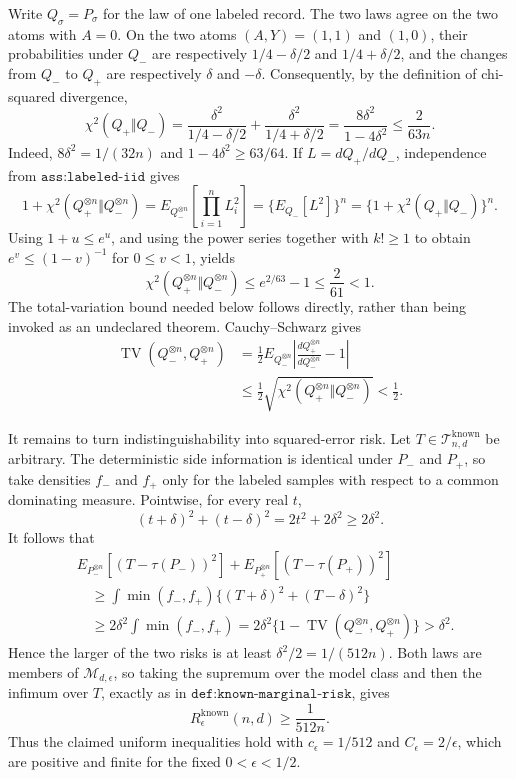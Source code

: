 Write \(Q_\sigma=P_\sigma\) for the law of one labeled record.  The two laws agree on the two atoms with \(A=0\).  On the two atoms \((A,Y)=(1,1)\) and \((1,0)\), their probabilities under \(Q_-\) are respectively \(1/4-\delta/2\) and \(1/4+\delta/2\), and the changes from \(Q_-\) to \(Q_+\) are respectively \(\delta\) and \(-\delta\).  Consequently, by the definition of chi-squared divergence,
\[
\chi^2(Q_+\Vert Q_-)
=\frac{\delta^2}{1/4-\delta/2}
 +\frac{\delta^2}{1/4+\delta/2}
=\frac{8\delta^2}{1-4\delta^2}
\leq\frac{2}{63n}.
\]
Indeed, \(8\delta^2=1/(32n)\) and \(1-4\delta^2\geq63/64\).  If \(L=dQ_+/dQ_-\), independence from \(\texttt{ass:labeled-iid}\) gives
\[
1+\chi^2(Q_+^{\otimes n}\Vert Q_-^{\otimes n})
=E_{Q_-^{\otimes n}}\!\left[\prod_{i=1}^{n}L_i^2\right]
=\{E_{Q_-}[L^2]\}^{n}
=\{1+\chi^2(Q_+\Vert Q_-)\}^{n}.
\]
Using \(1+u\leq e^u\), and using the power series together with \(k!\geq1\) to obtain \(e^v\leq(1-v)^{-1}\) for \(0\leq v<1\), yields
\[
\chi^2(Q_+^{\otimes n}\Vert Q_-^{\otimes n})
\leq e^{2/63}-1
\leq\frac{2}{61}<1.
\]
The total-variation bound needed below follows directly, rather than being invoked as an undeclared theorem.  Cauchy--Schwarz gives
\[
\begin{aligned}
\operatorname{TV}(Q_-^{\otimes n},Q_+^{\otimes n})
&=\frac12E_{Q_-^{\otimes n}}\left|
\frac{dQ_+^{\otimes n}}{dQ_-^{\otimes n}}-1
\right|\\
&\leq\frac12
\sqrt{\chi^2(Q_+^{\otimes n}\Vert Q_-^{\otimes n})}
<\frac12.
\end{aligned}
\]

It remains to turn indistinguishability into squared-error risk.  Let \(T\in\mathcal T^{\mathrm{known}}_{n,d}\) be arbitrary.  The deterministic side information is identical under \(P_-\) and \(P_+\), so take densities \(f_-\) and \(f_+\) only for the labeled samples with respect to a common dominating measure.  Pointwise, for every real \(t\),
\[
(t+\delta)^2+(t-\delta)^2=2t^2+2\delta^2\geq2\delta^2.
\]
It follows that
\[
\begin{aligned}
&E_{P_-^{\otimes n}}[(T-\tau(P_-))^2]
 +E_{P_+^{\otimes n}}[(T-\tau(P_+))^2]\\
&\quad\geq
\int \min(f_-,f_+)
\bigl\{(T+\delta)^2+(T-\delta)^2\bigr\}\\
&\quad\geq2\delta^2\int\min(f_-,f_+)
=2\delta^2\{1-\operatorname{TV}(Q_-^{\otimes n},Q_+^{\otimes n})\}
>\delta^2.
\end{aligned}
\]
Hence the larger of the two risks is at least \(\delta^2/2=1/(512n)\).  Both laws are members of \(\mathcal M_{d,\epsilon}\), so taking the supremum over the model class and then the infimum over \(T\), exactly as in \(\texttt{def:known-marginal-risk}\), gives
\[
R_\epsilon^{\mathrm{known}}(n,d)\geq\frac{1}{512n}.
\]
Thus the claimed uniform inequalities hold with \(c_\epsilon=1/512\) and \(C_\epsilon=2/\epsilon\), which are positive and finite for the fixed \(0<\epsilon<1/2\).

